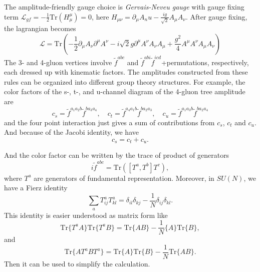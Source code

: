 \documentclass[12pt]{article}
\numberwithin{equation}{section}
\begin{document}
The amplitude-friendly gauge choice is \textit{Gervais-Neveu gauge } with gauge fixing term $\mathcal{L}_{gf}=-\frac{1}{2}\mathrm{Tr}(H_\mu^\mu)=0$, here $H_{\mu\nu}=\partial_\mu A_nu - \frac{ig}{\sqrt{2}}A_\mu A_\nu$.
After gauge fixing, the lagrangian becomes 
\begin{equation}
    \mathcal{L}=\mathrm{Tr} \left(-\frac{1}{2}\partial_\mu A_\nu \partial^\mu A^\nu - i\sqrt{2}g\partial^\mu A^\nu A_\nu A_\mu+\frac{g^2}{4}A^\mu A^\nu A_\mu A_\nu \right)
\end{equation}
The 3- and 4-gluon vertices involve $\tilde{f}^{abc}$ and $\tilde{f}^{abi}\tilde{f}^{icd}$+permutations, respectively, each dressed up with kinematic factors.
The amplitudes constructed from these rules can be organized into
different group theory structures. For example, the
color factors of the s-, t-, and u-channel diagram of the 4-gluon tree amplitude are
\begin{equation}
    c_s=\tilde{f}^{a_1a_2b}\tilde{f}^{ba_3a_4},\quad c_t=\tilde{f}^{a_4a_1b}\tilde{f}^{ba_2a_3},\quad c_u=\tilde{f}^{a_1a_3b}\tilde{f}^{ba_2a_4}
\end{equation}
and the four point interaction just gives a sum of contributions from $c_s$, $c_t$ and $c_u$. And because of the Jacobi identity, we have
\begin{equation}
    c_s=c_t+c_u.
\end{equation}

And the color factor can be written by the trace of product of generators
\begin{equation}
    i\tilde{f}^{abc}=\mathrm{Tr}([T^a,T^b]T^c),
\end{equation}
where $T^a$ are generators of fundamental representation. Moreover, in $SU(N)$, we have a Fierz identity
\begin{equation}
    \sum_{a}T^a_{ij}T^a_{kl}=\delta_{il}\delta_{kj}-\frac{1}{N}\delta_{ij}\delta_{kl}.
\end{equation}
This identity is easier understood as matrix form like 
\begin{equation}
    \mathrm{Tr}\{T^aA\}\mathrm{Tr}\{T^aB\}=\mathrm{Tr}\{AB\}-\frac{1}{N}\{A\}\mathrm{Tr}\{B\},
\end{equation}
and
\begin{equation}
    \mathrm{Tr}\{AT^aBT^a\}=\mathrm{Tr}\{A\}\mathrm{Tr}\{B\}-\frac{1}{N}\mathrm{Tr}\{AB\}.
\end{equation}
Then it can be used to simplify the calculation.
\end{document}
